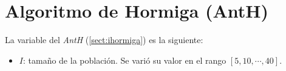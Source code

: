     
    
    

    
    
    

\section{Algoritmo de Hormiga (AntH)}\label{sect:aant}

    La variable del \emph{AntH} (\ref{sect:ihormiga}) es la siguiente:
    \begin{itemize}
        \item $I$: tamaño de la población. Se varió su valor en el rango
    $[5, 10, \cdots, 40]$.
    \end{itemize}

    
    
    

    
    
    
